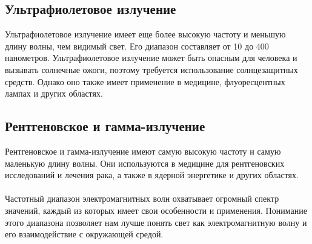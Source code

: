 \documentclass{article}
\begin{document}
\subsection{Ультрафиолетовое излучение}
Ультрафиолетовое излучение имеет еще более высокую частоту и меньшую длину волны, чем видимый свет. Его диапазон составляет от 10 до 400 нанометров. Ультрафиолетовое излучение может быть опасным для человека и вызывать солнечные ожоги, поэтому требуется использование солнцезащитных средств. Однако оно также имеет применение в медицине, флуоресцентных лампах и других областях.
\subsection{Рентгеновское и гамма-излучение}
Рентгеновское и гамма-излучение имеют самую высокую частоту и самую маленькую длину волны. Они используются в медицине для рентгеновских исследований и лечения рака, а также в ядерной энергетике и других областях.\\
~\\
Частотный диапазон электромагнитных волн охватывает огромный спектр значений, каждый из которых имеет свои особенности и применения. Понимание этого диапазона позволяет нам лучше понять свет как электромагнитную волну и его взаимодействие с окружающей средой.
\end{document}
